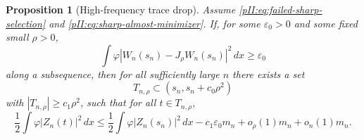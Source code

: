 \documentclass[11pt]{article}
\numberwithin{equation}{section}
\theoremstyle{plain}
\newtheorem{proposition}{Proposition}[section]
\theoremstyle{definition}
\theoremstyle{remark}
\newcommand{\dx}{\,dx}
\begin{document}
\begin{proposition}[High-frequency trace drop]\label{pII:prop:high-frequency-trace-drop}
Assume \eqref{pII:eq:failed-sharp-selection} and \eqref{pII:eq:sharp-almost-minimizer}.  If, for some $\varepsilon_0>0$ and some fixed small $\rho>0$,
\begin{equation}\label{pII:eq:hf-defect-for-drop}
        \int\varphi |W_n(s_n)-J_\rho W_n(s_n)|^2\dx
        \ge \varepsilon_0
\end{equation}
along a subsequence, then for all sufficiently large $n$ there exists a set
\[
        T_{n,\rho}\subset(s_n,s_n+c_0\rho^2)
\]
with $|T_{n,\rho}|\ge c_1\rho^2$, such that for all $t\in T_{n,\rho}$,
\begin{equation}\label{pII:eq:hf-drop-proved-conclusion}
        \frac12\int\varphi|Z_n(t)|^2\dx
        \le
        \frac12\int\varphi|Z_n(s_n)|^2\dx
        -c_1\varepsilon_0m_n+o_\rho(1)m_n+o_n(1)m_n.
\end{equation}
\end{proposition}
\end{document}

